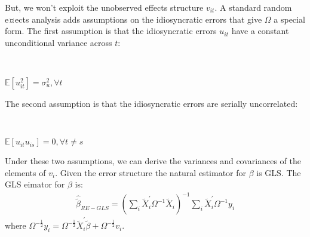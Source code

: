 But, we won't exploit the unobserved effects structure $v_{it}.$
A standard random e¤ects analysis adds assumptions on the idiosyncratic errors that
give $\Omega$ a special form. The first assumption is that the idiosyncratic errors
$u_{it}$ have a constant unconditional variance across $t$:
\begin{assumption}[RE-Homoskedasticity]\label{assumption:RE-homoskedasticity}
    \

    $\mathbb{E}[u_{it}^2] = \sigma_u^2, \forall t$
\end{assumption}
The second assumption is that the idiosyncratic errors are serially uncorrelated:
\begin{assumption}\label{assumption:RE-serial_uncorrelated}
    \

    $\mathbb{E}[u_{it} u_{is}] = 0, \forall t \neq s$
\end{assumption}
Under these two assumptions, we can derive the variances and covariances of the
elements of $v_i$.
Given the error structure the natural estimator for $\beta$ is GLS. The GLS eimator for $\beta$ is:
\begin{gather*}
    \hat{\tilde{\beta}}_{RE-GLS} = \left( \sum_i \tilde{X}_i^{\prime} \Omega^{-1} \tilde{X}_i \right)^{-1} \sum_i \tilde{X}_i^{\prime} \Omega^{-1} y_i
\end{gather*}
where $\Omega ^{-\frac{1}{2}} y_i = \Omega ^{-\frac{1}{2}} \tilde{X}_i^{\prime} \tilde{\beta} + \Omega^{-\frac{1}{2}}v_i.$
